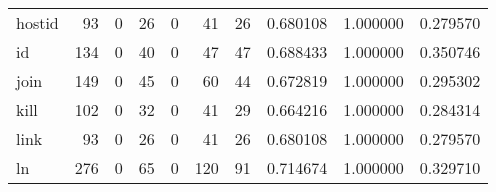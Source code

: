 \begin{tabular}{lrrrrrrrrr}
hostid    &                                                 93 &                                                  0 &                                                 26 &                                                  0 &                                                 41 &                                                 26 &                                           0.680108 &                               1.000000 &                             0.279570 \\
id        &                                                134 &                                                  0 &                                                 40 &                                                  0 &                                                 47 &                                                 47 &                                           0.688433 &                               1.000000 &                             0.350746 \\
join      &                                                149 &                                                  0 &                                                 45 &                                                  0 &                                                 60 &                                                 44 &                                           0.672819 &                               1.000000 &                             0.295302 \\
kill      &                                                102 &                                                  0 &                                                 32 &                                                  0 &                                                 41 &                                                 29 &                                           0.664216 &                               1.000000 &                             0.284314 \\
link      &                                                 93 &                                                  0 &                                                 26 &                                                  0 &                                                 41 &                                                 26 &                                           0.680108 &                               1.000000 &                             0.279570 \\
ln        &                                                276 &                                                  0 &                                                 65 &                                                  0 &                                                120 &                                                 91 &                                           0.714674 &                               1.000000 &                             0.329710 \\

\end{tabular}

